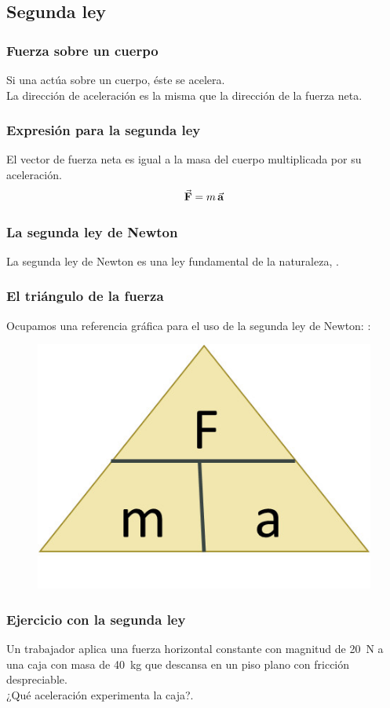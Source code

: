 \documentclass[14pt]{beamer}
\begin{document}
\subsection{Segunda ley}

\begin{frame}
\frametitle{Fuerza sobre un cuerpo}
Si una  actúa sobre un cuerpo, éste se acelera.
\\
\bigskip
\pause
La dirección de aceleración es la misma que la dirección de la fuerza neta. 
\end{frame}
\begin{frame}
\frametitle{Expresión para la segunda ley}
El vector de fuerza neta es igual a la masa del cuerpo multiplicada por su aceleración.
\pause
\begin{align*}
\va{F} = m \, \va{a}
\end{align*}
\end{frame}
\begin{frame}
\frametitle{La segunda ley de Newton}
La segunda ley de Newton es una ley fundamental de la naturaleza, \pause {}.
\end{frame}
\begin{frame}
\frametitle{El triángulo de la fuerza}
Ocupamos una referencia gráfica para el uso de la segunda ley de Newton: \pause {}:
\pause
\begin{figure}
\includegraphics[scale=1]{Imagenes/Newton_11.jpg}
\end{figure}
\end{frame}
\begin{frame}
\frametitle{Ejercicio con la segunda ley}
Un trabajador aplica una fuerza horizontal constante con magnitud de \SI{20}{\newton} a una caja con masa de \SI{40}{\kilo\gram} que descansa en un piso plano con fricción despreciable.
\\
\bigskip
\pause
¿Qué aceleración experimenta la caja?.
\end{frame}
\end{document}
